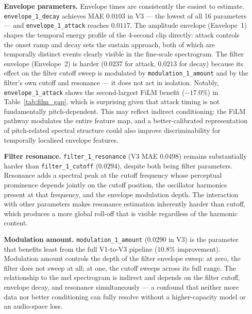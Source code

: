 \noindent \newline
\textbf{Envelope parameters.} Envelope times are consistently the easiest to estimate. \texttt{envelope\_1\_decay} achieves MAE $0.0103$ in V3 — the lowest of all 16 parameters — and \texttt{envelope\_1\_attack} reaches $0.0117$. The amplitude envelope (Envelope~1) shapes the temporal energy profile of the 4-second clip directly: attack controls the onset ramp and decay sets the sustain approach, both of which are temporally distinct events clearly visible in the fine-scale spectrogram. The filter envelope (Envelope~2) is harder ($0.0237$ for attack, $0.0213$ for decay) because its effect on the filter cutoff sweep is modulated by \texttt{modulation\_1\_amount} and by the filter's own cutoff and resonance — it does not act in isolation. Notably, \texttt{envelope\_1\_attack} shows the second-largest FiLM benefit ($-17.0\%$) in Table~\ref{tab:film_gap}, which is surprising given that attack timing is not fundamentally pitch-dependent. This may reflect indirect conditioning: the FiLM pathway modulates the entire feature map, and a better-calibrated representation of pitch-related spectral structure could also improve discriminability for temporally localised envelope features.

\noindent \newline
\textbf{Filter resonance.} \texttt{filter\_1\_resonance} (V3 MAE $0.0498$) remains substantially harder than \texttt{filter\_1\_cutoff} ($0.0294$), despite both being filter parameters. Resonance adds a spectral peak at the cutoff frequency whose perceptual prominence depends jointly on the cutoff position, the oscillator harmonics present at that frequency, and the envelope modulation depth. The interaction with other parameters makes resonance estimation inherently harder than cutoff, which produces a more global roll-off that is visible regardless of the harmonic content.

\noindent \newline
\textbf{Modulation amount.} \texttt{modulation\_1\_amount} ($0.0290$ in V3) is the parameter that benefits least from the full V1-to-V3 pipeline ($10.8\%$ improvement). Modulation amount controls the depth of the filter envelope sweep: at zero, the filter does not sweep at all; at one, the cutoff sweeps across its full range. The relationship to the mel spectrogram is indirect and depends on the filter cutoff, envelope decay, and resonance simultaneously — a confound that neither more data nor better conditioning can fully resolve without a higher-capacity model or an audio-space loss.

